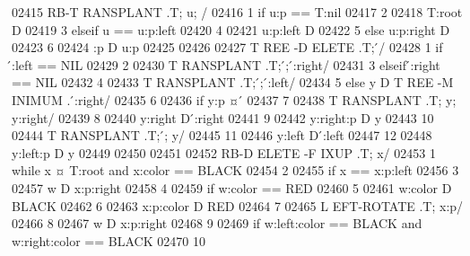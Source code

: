 \begin{DoxyCode}
02415 \textcolor{comment}{                RB-T RANSPLANT .T; u; /}
02416 \textcolor{comment}{        1 if u:p == T:nil}
02417 \textcolor{comment}{        2}
02418 \textcolor{comment}{        T:root D}
02419 \textcolor{comment}{        3 elseif u == u:p:left}
02420 \textcolor{comment}{        4}
02421 \textcolor{comment}{        u:p:left D}
02422 \textcolor{comment}{        5 else u:p:right D}
02423 \textcolor{comment}{        6}
02424 \textcolor{comment}{        :p D u:p}
02425 \textcolor{comment}{}
02426 \textcolor{comment}{}
02427 \textcolor{comment}{        T REE -D ELETE .T;  ́/}
02428 \textcolor{comment}{        1 if  ́:left == NIL}
02429 \textcolor{comment}{        2}
02430 \textcolor{comment}{        T RANSPLANT .T;  ́;  ́:right/}
02431 \textcolor{comment}{        3 elseif  ́:right == NIL}
02432 \textcolor{comment}{        4}
02433 \textcolor{comment}{        T RANSPLANT .T;  ́;  ́:left/}
02434 \textcolor{comment}{        5 else y D T REE -M INIMUM . ́:right/}
02435 \textcolor{comment}{        6}
02436 \textcolor{comment}{        if y:p ¤  ́}
02437 \textcolor{comment}{        7}
02438 \textcolor{comment}{        T RANSPLANT .T; y; y:right/}
02439 \textcolor{comment}{        8}
02440 \textcolor{comment}{        y:right D  ́:right}
02441 \textcolor{comment}{        9}
02442 \textcolor{comment}{        y:right:p D y}
02443 \textcolor{comment}{        10}
02444 \textcolor{comment}{        T RANSPLANT .T;  ́; y/}
02445 \textcolor{comment}{        11}
02446 \textcolor{comment}{        y:left D  ́:left}
02447 \textcolor{comment}{        12}
02448 \textcolor{comment}{        y:left:p D y}
02449 \textcolor{comment}{}
02450 \textcolor{comment}{}
02451 \textcolor{comment}{}
02452 \textcolor{comment}{        RB-D ELETE -F IXUP .T; x/}
02453 \textcolor{comment}{        1 while x ¤ T:root and x:color == BLACK}
02454 \textcolor{comment}{        2}
02455 \textcolor{comment}{        if x == x:p:left}
02456 \textcolor{comment}{        3}
02457 \textcolor{comment}{        w D x:p:right}
02458 \textcolor{comment}{        4}
02459 \textcolor{comment}{        if w:color == RED}
02460 \textcolor{comment}{        5}
02461 \textcolor{comment}{        w:color D BLACK}
02462 \textcolor{comment}{        6}
02463 \textcolor{comment}{        x:p:color D RED}
02464 \textcolor{comment}{        7}
02465 \textcolor{comment}{        L EFT-ROTATE .T; x:p/}
02466 \textcolor{comment}{        8}
02467 \textcolor{comment}{        w D x:p:right}
02468 \textcolor{comment}{        9}
02469 \textcolor{comment}{        if w:left:color == BLACK and w:right:color == BLACK}
02470 \textcolor{comment}{        10}

\end{DoxyCode}
